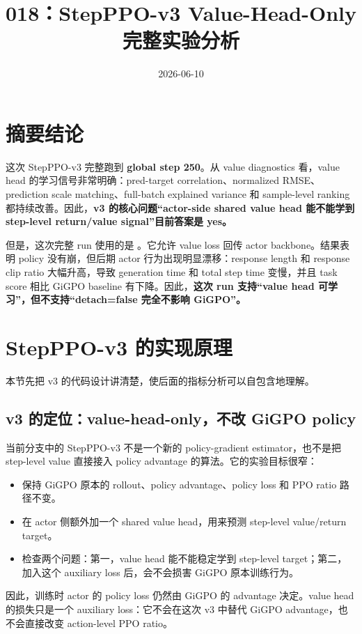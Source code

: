 \documentclass[10pt]{ctexart}
\title{018：StepPPO-v3 Value-Head-Only 完整实验分析}
\author{}
\date{2026-06-10}
\begin{document}
\maketitle
\vspace{-1.2em}

\section*{摘要结论}
这次 StepPPO-v3 完整跑到 \textbf{global step 250}。从 value diagnostics 看，value head 的学习信号非常明确：pred-target correlation、normalized RMSE、prediction scale matching、full-batch explained variance 和 sample-level ranking 都持续改善。因此，\textbf{v3 的核心问题“actor-side shared value head 能不能学到 step-level return/value signal”目前答案是 yes。}

但是，这次完整 run 使用的是 。它允许 value loss 回传 actor backbone。结果表明 policy 没有崩，但后期 actor 行为出现明显漂移：response length 和 response clip ratio 大幅升高，导致 generation time 和 total step time 变慢，并且 task score 相比 GiGPO baseline 有下降。因此，\textbf{这次 run 支持“value head 可学习”，但不支持“detach=false 完全不影响 GiGPO”。}

\section{StepPPO-v3 的实现原理}
本节先把 v3 的代码设计讲清楚，使后面的指标分析可以自包含地理解。

\subsection{v3 的定位：value-head-only，不改 GiGPO policy}
当前分支中的 StepPPO-v3 不是一个新的 policy-gradient estimator，也不是把 step-level value 直接接入 policy advantage 的算法。它的实验目标很窄：
\begin{itemize}
  \item 保持 GiGPO 原本的 rollout、policy advantage、policy loss 和 PPO ratio 路径不变。
  \item 在 actor 侧额外加一个 shared value head，用来预测 step-level value/return target。
  \item 检查两个问题：第一，value head 能不能稳定学到 step-level target；第二，加入这个 auxiliary loss 后，会不会损害 GiGPO 原本训练行为。
\end{itemize}

因此，训练时 actor 的 policy loss 仍然由 GiGPO 的 advantage 决定。value head 的损失只是一个 auxiliary loss：它不会在这次 v3 中替代 GiGPO advantage，也不会直接改变 action-level PPO ratio。
\end{document}
